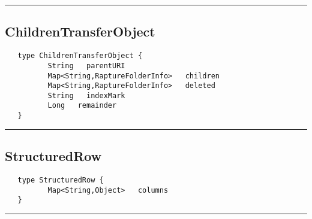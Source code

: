 \rule{15cm}{2pt}
\subsection{ChildrenTransferObject}
\label{type:ChildrenTransferObject}

\begin{verbatim}
   type ChildrenTransferObject {
          String   parentURI
          Map<String,RaptureFolderInfo>   children
          Map<String,RaptureFolderInfo>   deleted
          String   indexMark
          Long   remainder
   }
\end{verbatim}

\rule{15cm}{2pt}
\subsection{StructuredRow}
\label{type:StructuredRow}

\begin{verbatim}
   type StructuredRow {
          Map<String,Object>   columns
   }
\end{verbatim}

\rule{15cm}{2pt}
